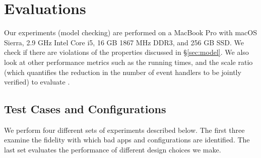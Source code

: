 \chapter{Evaluations}
\label{sec:eval}
Our experiments (model checking) are performed on a MacBook Pro with macOS Sierra, 2.9 GHz Intel Core i5, 16 GB 1867 MHz DDR3, and 256 GB SSD.
We check if there are violations of the properties 
discussed in \S\ref{sec:model}.
We also look at other performance metrics such as the running times,
and the scale ratio (which quantifies the reduction in the number of event handlers
to be jointly verified) to evaluate \sys.

\section{Test Cases and Configurations}
We perform four different sets of experiments described below.
The first three examine the fidelity with which bad apps and configurations are identified.
The last set evaluates the performance of different design choices we make.


